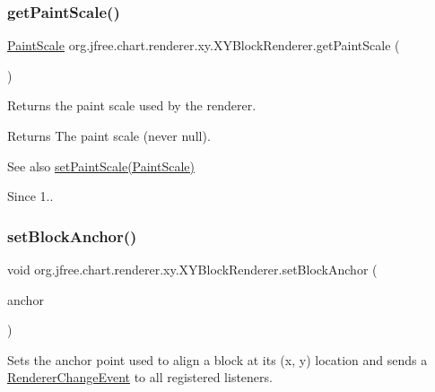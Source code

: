 \subsubsection{\texorpdfstring{get\+Paint\+Scale()}{getPaintScale()}}
{\footnotesize\ttfamily \mbox{\hyperlink{interfaceorg_1_1jfree_1_1chart_1_1renderer_1_1_paint_scale}{Paint\+Scale}} org.\+jfree.\+chart.\+renderer.\+xy.\+X\+Y\+Block\+Renderer.\+get\+Paint\+Scale (\begin{DoxyParamCaption}{ }\end{DoxyParamCaption})}

Returns the paint scale used by the renderer.

\begin{DoxyReturn}{Returns}
The paint scale (never {\ttfamily null}).
\end{DoxyReturn}
\begin{DoxySeeAlso}{See also}
\mbox{\hyperlink{classorg_1_1jfree_1_1chart_1_1renderer_1_1xy_1_1_x_y_block_renderer_afd5b5bf65eeda72c806beab182dfbf07}{set\+Paint\+Scale(\+Paint\+Scale)}} 
\end{DoxySeeAlso}
\begin{DoxySince}{Since}
1.. 
\end{DoxySince}
\mbox{\label{classorg_1_1jfree_1_1chart_1_1renderer_1_1xy_1_1_x_y_block_renderer_abec4bea582737e1d78ac51ddadc9b095}} 
\subsubsection{\texorpdfstring{set\+Block\+Anchor()}{setBlockAnchor()}}
{\footnotesize\ttfamily void org.\+jfree.\+chart.\+renderer.\+xy.\+X\+Y\+Block\+Renderer.\+set\+Block\+Anchor (\begin{DoxyParamCaption}\item[{Rectangle\+Anchor}]{anchor }\end{DoxyParamCaption})}

Sets the anchor point used to align a block at its (x, y) location and sends a \mbox{\hyperlink{}{Renderer\+Change\+Event}} to all registered listeners.


